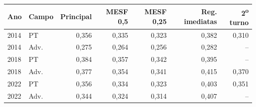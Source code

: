 \begin{tabular}{llrrrrr}
\toprule
Ano & Campo & Principal & MESF 0,5 & MESF 0,25 & Reg. imediatas & 2\textsuperscript{o} turno \\
\midrule
2014 & PT & 0{,}356 & 0{,}335 & 0{,}323 & 0{,}382 & 0{,}310 \\
2014 & Adv. & 0{,}275 & 0{,}264 & 0{,}256 & 0{,}282 & -- \\
2018 & PT & 0{,}384 & 0{,}357 & 0{,}342 & 0{,}395 & -- \\
2018 & Adv. & 0{,}377 & 0{,}354 & 0{,}341 & 0{,}415 & 0{,}370 \\
2022 & PT & 0{,}356 & 0{,}334 & 0{,}323 & 0{,}403 & 0{,}351 \\
2022 & Adv. & 0{,}344 & 0{,}324 & 0{,}314 & 0{,}407 & -- \\
\bottomrule
\end{tabular}
